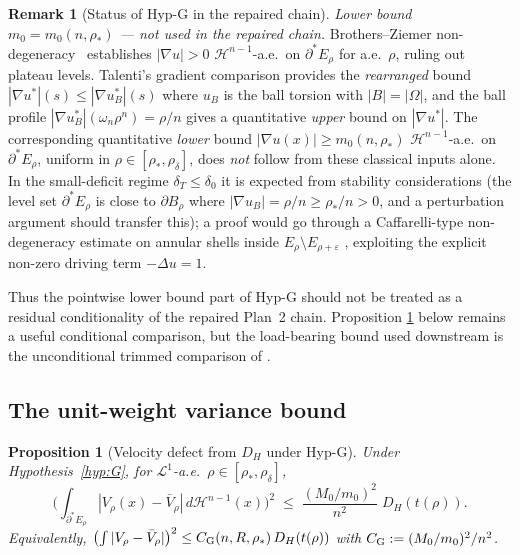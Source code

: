 \documentclass[11pt]{article}
\newtheorem{proposition}[theorem]{Proposition}
\theoremstyle{definition}
\newtheorem{remark}[theorem]{Remark}
\newcommand{\Om}{\Omega}
\newcommand{\eps}{\varepsilon}
\newcommand{\rstar}{\rho_{*}}
\begin{document}
\begin{remark}[Status of Hyp-G in the repaired chain]
\emph{Lower bound $m_{0}=m_{0}(n,\rstar)$ --- not used in the repaired chain.}
Brothers--Ziemer non-degeneracy~\cite[Thm.~1]{BrothersZiemer1988}
establishes $|\nabla u|>0$ $\mathcal H^{n-1}$-a.e.\ on
$\partial^{*}E_{\rho}$ for a.e.\ $\rho$, ruling out plateau levels.
Talenti's gradient comparison \cite{Talenti1976} provides the
\emph{rearranged} bound $|\nabla u^{*}|(s)\le|\nabla u_{B}^{*}|(s)$
where $u_{B}$ is the ball torsion with $|B|=|\Om|$, and the ball
profile $|\nabla u_{B}^{*}|(\omega_{n}\rho^{n})=\rho/n$ gives a
quantitative \emph{upper} bound on $|\nabla u^{*}|$.  The corresponding
quantitative \emph{lower} bound $|\nabla u(x)|\ge m_{0}(n,\rstar)$
$\mathcal H^{n-1}$-a.e.\ on $\partial^{*}E_{\rho}$, uniform in
$\rho\in[\rstar,\rho_{\delta}]$, does \emph{not} follow from these
classical inputs alone.  In the small-deficit regime
$\delta_{T}\le\delta_{0}$ it is expected from stability considerations
(the level set $\partial^{*}E_{\rho}$ is close to $\partial B_{\rho}$
where $|\nabla u_{B}|=\rho/n\ge\rstar/n>0$, and a perturbation argument
should transfer this); a proof would go through a Caffarelli-type
non-degeneracy estimate on annular shells inside $E_{\rho}\setminus E_{\rho+\eps}$
\cite[\S 7]{CafCab1995}, exploiting the explicit non-zero
driving term $-\Delta u=1$.

Thus the pointwise lower bound part of Hyp-G should not be treated as a
residual conditionality of the repaired Plan~2 chain.  Proposition
\ref{prop:V-bar-V} below remains a useful conditional comparison, but
the load-bearing bound used downstream is the unconditional trimmed
comparison of \cite{TrimmedVelocityRepair}.
\end{remark}

\subsection{The unit-weight variance bound}\label{ssec:unitvar}

\begin{proposition}[Velocity defect from $D_{H}$ under Hyp-G]
\label{prop:V-bar-V}
Under Hypothesis~\ref{hyp:G}, for $\mathcal L^{1}$-a.e.\
$\rho\in[\rstar,\rho_{\delta}]$,
\begin{equation}\label{eq:V-bar-V-bound}
   \Biggl(\int_{\partial^{*}E_{\rho}}\!\!|V_{\rho}(x)-\bar V_{\rho}|\,
     d\mathcal H^{n-1}(x)\Biggr)^{\!2}
   \;\le\;\frac{(M_{0}/m_{0})^{2}}{n^{2}}\;
     D_{H}(t(\rho)).
\end{equation}
Equivalently, $\bigl(\int|V_{\rho}-\bar V_{\rho}|\bigr)^{2}\le
C_{\rm G}(n,R,\rstar)\,D_{H}(t(\rho))$ with
$C_{\rm G}:=(M_{0}/m_{0})^{2}/n^{2}$.
\end{proposition}
\end{document}
